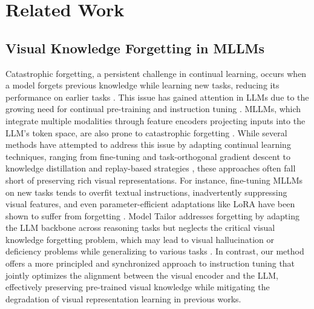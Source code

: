 \section{Related Work}







\subsection{Visual Knowledge Forgetting in MLLMs}
Catastrophic forgetting, a persistent challenge in continual learning, 
occurs when a model forgets previous knowledge while learning new tasks, reducing its performance on earlier tasks \cite{wang2023orthogonal}. 
This issue has gained attention in LLMs due to the growing need for continual pre-training and instruction tuning \cite{wu2024continual,luo2023empirical}. 
MLLMs, which integrate multiple modalities through feature encoders projecting inputs into the LLM’s token space, are also prone to catastrophic forgetting \cite{zhai2023investigating}. 
While several methods have attempted to address this issue by adapting continual learning techniques, 
ranging from fine-tuning and task-orthogonal gradient descent to knowledge distillation and replay-based strategies \cite{shi2024continual, wu2024continual, zhu2024model, zheng2024beyond}, 
these approaches often fall short of preserving rich visual representations. 
For instance, fine-tuning MLLMs on new tasks tends to overfit textual instructions, inadvertently suppressing visual features, and even parameter-efficient adaptations like LoRA have been shown to suffer from forgetting \cite{fawi2024curlora, liu2024learning}. 
Model Tailor \cite{zhu2024model} addresses forgetting by adapting the LLM backbone across reasoning tasks but neglects the critical visual knowledge forgetting problem,
which may lead to visual hallucination or deficiency problems while generalizing to various tasks \cite{zhai2023investigating}. 
In contrast, our method offers a more principled and synchronized approach to instruction tuning that jointly optimizes the alignment between the visual encoder and the LLM, 
effectively preserving pre-trained visual knowledge while mitigating the degradation of visual representation learning in previous works.


